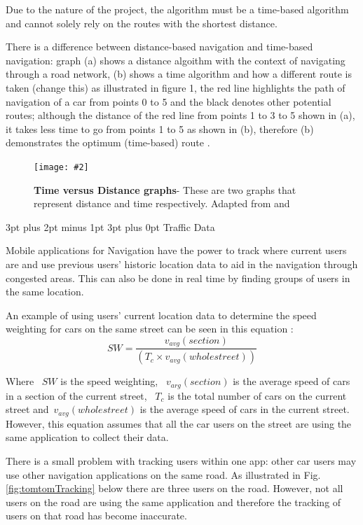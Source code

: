 \documentclass[12pt,a4paper]{article}
\makeatletter
\newcommand{\figuremacro}[5]{
    \begin{figure}[#1]
        \centering
        \texttt{[image: \#2]}
        \caption[#3]{\textbf{#3}#4}
        \label{fig:#2}
    \end{figure}
}
\renewcommand\subsection{\@startsection {subsection}{1}{0mm} %
                               {3pt plus 2pt minus 1pt} %
                               {3pt plus 0pt} %
                               {\normalfont\bfseries}}
\makeatother
\begin{document}
Due to the nature of the project, the algorithm must be a time-based algorithm and cannot solely rely on the routes with the shortest distance.

There is a difference between distance-based navigation and time-based navigation: graph (a) shows a distance algoithm with the context of navigating through a road network, (b) shows a time algorithm and how a different route is taken (change this) as illustrated in figure 1, the red line highlights the path of navigation of a car from points 0 to 5 and the black denotes other potential routes; although the distance 
of the red line from points 1 to 3 to 5 shown in (a), it takes less time to go from points 1 to 5 as shown in (b), therefore (b) demonstrates the optimum (time-based) route \cite{Zheng2018}. 

\figuremacro{h}{TimevsDistanceWeightFactors}{Time versus Distance graphs}{- These are two graphs that represent distance and time respectively. Adapted from \cite{Zheng2018} and \cite{SpeedvsTime}}{0.6} 

\subsection{Traffic Data}

Mobile applications for Navigation have the power to track where current users are and use previous users’ historic location data to aid in the navigation through congested areas. This can also be done in real time by finding groups of users in the same location.

An example of using users’ current location data to determine the speed weighting for cars on the same street can be seen in this equation \cite{Zheng2018}: 
\[
    SW = \frac{v_{avg}(section)}{(T_c \times v_{avg}(whole street))}
\]

Where ~$SW$ is the speed weighting, ~$v_{arg}(section)$ is the average speed of cars in a section of the current street, ~$T_c$ is the total number of cars on the current street and\newline ~$v_{avg}(whole street)$ is the average speed of cars in the current street. However, this equation assumes that all the car users on the street are using the same application to collect their data. 

There is a small problem with tracking users within one app: other car users may use other navigation applications on the same road. As illustrated in Fig.\ref{fig:tomtomTracking} below there are three users on the road. However, not all users on the road are using the same application and therefore the tracking of users on that road has become inaccurate.
\end{document}
